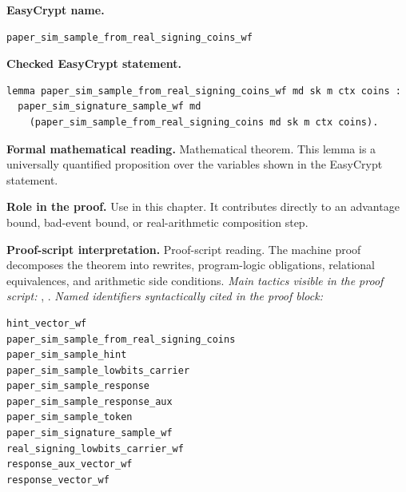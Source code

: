 \begin{formaltheorem}
\noindent\textbf{EasyCrypt name.}
\begin{lstlisting}[language=EasyCrypt,basicstyle=\ttfamily\scriptsize]
paper_sim_sample_from_real_signing_coins_wf
\end{lstlisting}
\noindent\textbf{Checked EasyCrypt statement.}
\begin{lstlisting}[language=EasyCrypt,basicstyle=\ttfamily\scriptsize]
lemma paper_sim_sample_from_real_signing_coins_wf md sk m ctx coins :
  paper_sim_signature_sample_wf md
    (paper_sim_sample_from_real_signing_coins md sk m ctx coins).
\end{lstlisting}
\noindent\textbf{Formal mathematical reading.}
Mathematical theorem. This lemma is a universally quantified proposition over the variables shown in the EasyCrypt statement.

\noindent\textbf{Role in the proof.}
Use in this chapter. It contributes directly to an advantage bound, bad-event bound, or real-arithmetic composition step.

\noindent\textbf{Proof-script interpretation.}
Proof-script reading. The machine proof decomposes the theorem into rewrites, program-logic obligations, relational equivalences, and arithmetic side conditions.
\emph{Main tactics visible in the proof script:} , .
\emph{Named identifiers syntactically cited in the proof block:}
\begin{lstlisting}[language=EasyCrypt,basicstyle=\ttfamily\scriptsize]
hint_vector_wf
paper_sim_sample_from_real_signing_coins
paper_sim_sample_hint
paper_sim_sample_lowbits_carrier
paper_sim_sample_response
paper_sim_sample_response_aux
paper_sim_sample_token
paper_sim_signature_sample_wf
real_signing_lowbits_carrier_wf
response_aux_vector_wf
response_vector_wf
\end{lstlisting}

\end{formaltheorem}

